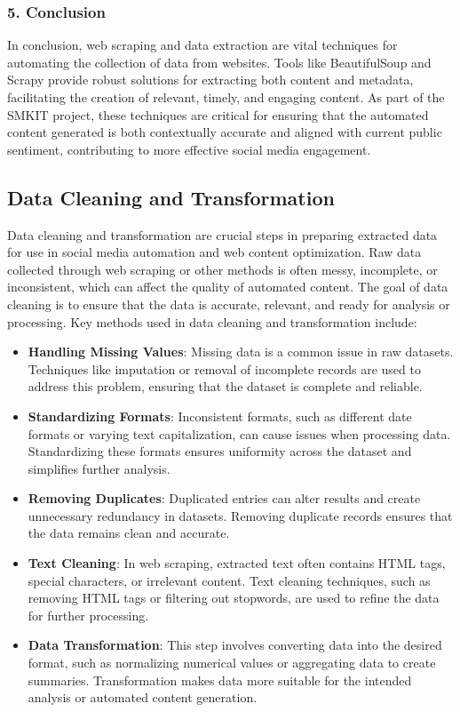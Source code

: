 \subsubsection{5. Conclusion}

In conclusion, web scraping and data extraction are vital techniques for automating the collection of data from websites. Tools like BeautifulSoup and Scrapy provide robust solutions for extracting both content and metadata, facilitating the creation of relevant, timely, and engaging content. As part of the SMKIT project, these techniques are critical for ensuring that the automated content generated is both contextually accurate and aligned with current public sentiment, contributing to more effective social media engagement.


\subsection{Data Cleaning and Transformation}
\label{subsec:data_cleaning_and_transformation}

Data cleaning and transformation are crucial steps in preparing extracted data for use in social media automation and web content optimization. Raw data collected through web scraping or other methods is often messy, incomplete, or inconsistent, which can affect the quality of automated content. The goal of data cleaning is to ensure that the data is accurate, relevant, and ready for analysis or processing. Key methods used in data cleaning and transformation include:

\begin{itemize}
    \item \textbf{Handling Missing Values}: Missing data is a common issue in raw datasets. Techniques like imputation or removal of incomplete records are used to address this problem, ensuring that the dataset is complete and reliable.
    \item \textbf{Standardizing Formats}: Inconsistent formats, such as different date formats or varying text capitalization, can cause issues when processing data. Standardizing these formats ensures uniformity across the dataset and simplifies further analysis.
    \item \textbf{Removing Duplicates}: Duplicated entries can alter results and create unnecessary redundancy in datasets. Removing duplicate records ensures that the data remains clean and accurate.
    \item \textbf{Text Cleaning}: In web scraping, extracted text often contains HTML tags, special characters, or irrelevant content. Text cleaning techniques, such as removing HTML tags or filtering out stopwords, are used to refine the data for further processing.
    \item \textbf{Data Transformation}: This step involves converting data into the desired format, such as normalizing numerical values or aggregating data to create summaries. Transformation makes data more suitable for the intended analysis or automated content generation.
\end{itemize}

